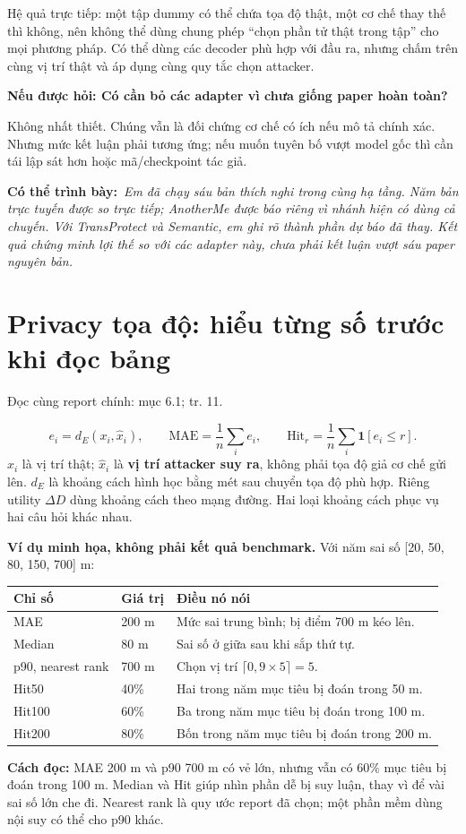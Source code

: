 \documentclass[10pt,a4paper]{article}
\newcommand{\say}[1]{\par\textbf{Có thể trình bày:}\ \textit{#1}\par}
\newcommand{\ask}[2]{\par\textbf{Nếu được hỏi: #1}\par #2\par}
\newcommand{\where}[1]{\par{\small\color{gray}Đọc cùng report chính: #1.}\par}
\newcommand{\example}{\textbf{Ví dụ minh họa, không phải kết quả benchmark.} }
\newcommand{\guidepage}[1]{\clearpage\section{#1}}
\begin{document}
Hệ quả trực tiếp: một tập dummy có thể chứa tọa độ thật, một cơ chế thay thế thì không, nên không thể dùng chung phép ``chọn phần tử thật trong tập'' cho mọi phương pháp. Có thể dùng các decoder phù hợp với đầu ra, nhưng chấm trên cùng vị trí thật và áp dụng cùng quy tắc chọn attacker.

\ask{Có cần bỏ các adapter vì chưa giống paper hoàn toàn?}{Không nhất thiết. Chúng vẫn là đối chứng cơ chế có ích nếu mô tả chính xác. Nhưng mức kết luận phải tương ứng; nếu muốn tuyên bố vượt model gốc thì cần tái lập sát hơn hoặc mã/checkpoint tác giả.}
\say{Em đã chạy sáu bản thích nghi trong cùng hạ tầng. Năm bản trực tuyến được so trực tiếp; AnotherMe được báo riêng vì nhánh hiện có dùng cả chuyến. Với TransProtect và Semantic, em ghi rõ thành phần dự báo đã thay. Kết quả chứng minh lợi thế so với các adapter này, chưa phải kết luận vượt sáu paper nguyên bản.}

\guidepage{Privacy tọa độ: hiểu từng số trước khi đọc bảng}
\where{mục 6.1; tr. 11}
\[
e_i=d_E(x_i,\widehat x_i),\qquad
\mathrm{MAE}=\frac1n\sum_i e_i,\qquad
\mathrm{Hit}_r=\frac1n\sum_i\mathbf 1[e_i\le r].
\]
$x_i$ là vị trí thật; $\widehat x_i$ là \textbf{vị trí attacker suy ra}, không phải tọa độ giả cơ chế gửi lên. $d_E$ là khoảng cách hình học bằng mét sau chuyển tọa độ phù hợp. Riêng utility $\Delta D$ dùng khoảng cách theo mạng đường. Hai loại khoảng cách phục vụ hai câu hỏi khác nhau.

\example Với năm sai số [20, 50, 80, 150, 700] m:
\begin{longtable}{@{}P{4.0cm}P{3.5cm}P{8.7cm}@{}}
\toprule Chỉ số & Giá trị & Điều nó nói\\\midrule
MAE & 200 m & Mức sai trung bình; bị điểm 700 m kéo lên.\\[3pt]
Median & 80 m & Sai số ở giữa sau khi sắp thứ tự.\\[3pt]
p90, nearest rank & 700 m & Chọn vị trí $\lceil0,9\times5\rceil=5$.\\[3pt]
Hit50 & 40\% & Hai trong năm mục tiêu bị đoán trong 50 m.\\[3pt]
Hit100 & 60\% & Ba trong năm mục tiêu bị đoán trong 100 m.\\[3pt]
Hit200 & 80\% & Bốn trong năm mục tiêu bị đoán trong 200 m.\\
\bottomrule
\end{longtable}

\textbf{Cách đọc:} MAE 200 m và p90 700 m có vẻ lớn, nhưng vẫn có 60\% mục tiêu bị đoán trong 100 m. Median và Hit giúp nhìn phần dễ bị suy luận, thay vì để vài sai số lớn che đi. Nearest rank là quy ước report đã chọn; một phần mềm dùng nội suy có thể cho p90 khác.
\end{document}
